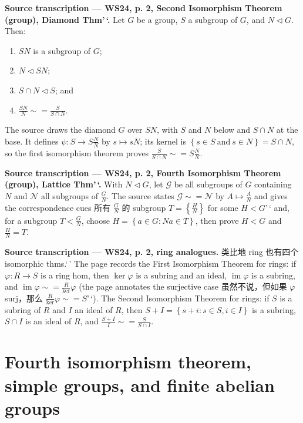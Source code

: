 \textbf{Source transcription --- WS24, p. 2, Second Isomorphism Theorem (group), Diamond Thm'\,`.} Let \(G\) be a group, \(S\) a subgroup of \(G\), and \(N \lhd G\). Then:

\begin{enumerate}
\tightlist
\item
  \(SN\) is a subgroup of \(G\);
\item
  \(N \lhd SN\);
\item
  \(S \cap N \lhd S\); and
\item
  \(\frac{SN}{N} \sim = \frac{S}{S \cap N}\).
\end{enumerate}

The source draws the diamond \(G\) over \(SN\), with \(S\) and \(N\) below and \(S \cap N\) at the base. It defines \(\psi:S\rightarrow S\frac{N}{N}\) by \(s\mapsto sN\); its kernel is \(\left\{ {s \in S\ \text{and}\ s \in N} \right\} = S \cap N\), so the first isomorphism theorem proves \(\frac{S}{S \cap N} \sim = S\frac{N}{N}\).

\textbf{Source transcription --- WS24, p. 2, Fourth Isomorphism Theorem (group), Lattice Thm'\,`.} With \(N \lhd G\), let \(\mathcal{G}\) be all subgroups of \(G\) containing \(N\) and \(\mathcal{N}\) all subgroups of \(\frac{G}{N}\). The source states \(\mathcal{G} \sim = \mathcal{N}\) by \(A\mapsto\frac{A}{N}\) and gives the correspondence cues 所有 \(\frac{G}{N}\) 的 subgroup \(T = \left\{ \frac{H}{N} \right\}\) for some \(H < G\)'\,` and, for a subgroup \(T < \frac{G}{N}\), choose \(H = \left\{ {a \in G:Na \in T} \right\}\), then prove \(H < G\) and \(\frac{H}{N} = T\).

\textbf{Source transcription --- WS24, p. 2, ring analogues.} 类比地 ring 也有四个 isomorphic thms.`\,' The page records the First Isomorphism Theorem for rings: if \(\varphi:R\rightarrow S\) is a ring hom, then \(\ker\varphi\) is a subring and an ideal, \(\operatorname{im}\varphi\) is a subring, and \(\operatorname{im}\varphi \sim = \frac{R}{\ker}\varphi\) (the page annotates the surjective case 虽然不说，但如果 \(\varphi\) surj，那么 \(\frac{R}{\ker}\varphi \sim = S\)'\,`). The Second Isomorphism Theorem for rings: if \(S\) is a subring of \(R\) and \(I\) an ideal of \(R\), then \(S + I = \left\{ {s + i:s \in S,i \in I} \right\}\) is a subring, \(S \cap I\) is an ideal of \(R\), and \(\frac{S + I}{I} \sim = \frac{S}{S \cap I}\).

\section{Fourth isomorphism theorem, simple groups, and finite abelian groups}

